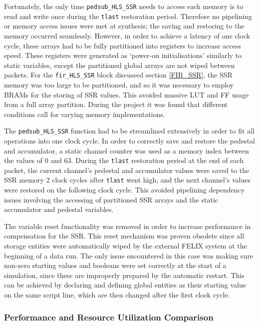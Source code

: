 \documentclass[10pt]{article}
\begin{document}
Fortunately, the only time \texttt{pedsub\_HLS\_SSR} needs to access each memory is to read and write once during the \texttt{tlast} restoration period. Therefore no pipelining or memory access issues were met at synthesis; the saving and restoring to the memory occurred seamlessly. However, in order to achieve a latency of one clock cycle, these arrays had to be fully partitioned into registers to increase access speed. These registers were generated as `power-on initialisations' similarly to static variables, except the partitioned global arrays are not wiped between packets. For the \texttt{fir\_HLS\_SSR} block discussed section \ref{FIR_SSR}, the SSR memory was too large to be partitioned, and so it was necessary to employ BRAMs for the storing of SSR values. This avoided massive LUT and FF usage from a full array partition. During the project it was found that different conditions call for varying memory implementations.

The \texttt{pedsub\_HLS\_SSR} function had to be streamlined extensively in order to fit all operations into one clock cycle. In order to correctly save and restore the pedestal and accumulator, a static channel counter was used as a memory index between the values of 0 and 63. During the \texttt{tlast} restoration period at the end of each packet, the current channel's pedestal and accumulator values were saved to the SSR memory 2 clock cycles after \texttt{tlast} went high, and the next channel's values were restored on the following clock cycle. This avoided pipelining dependency issues involving the accessing of partitioned SSR arrays and the static accumulator and pedestal variables.

The variable reset functionality was removed in order to increase performance in compensation for the SSR. This reset mechanism was proven obsolete since all storage entities were automatically wiped by the external FELIX system at the beginning of a data run. The only issue encountered in this case was making sure non-zero starting values and booleans were set correctly at the start of a simulation, since these are improperly prepared by the automatic restart. This can be achieved by declaring and defining global entities as their starting value on the same script line, which are then changed after the first clock cycle.

\subsubsection*{Performance and Resource Utilization Comparison}
\end{document}
